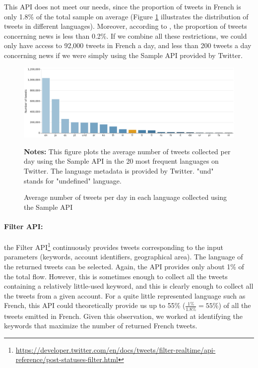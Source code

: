 This API does not meet our needs, since the proportion of tweets in French is only 1.8\% of the total sample on average
(Figure \ref{Figure:HistogramLanguages} illustrates the distribution of tweets in different languages). Moreover, according to \citet{liu_reuters_2016}, the proportion of tweets concerning news is less than 0.2\%. If we combine all these restrictions, we could only have access to 92,000 tweets in French a day, and less than 200 tweets a day concerning news if we were simply using the Sample API provided by Twitter.


\begin{figure}
\begin{center}
\includegraphics[width=1\textwidth]{figures/HistogramLanguages.pdf}
\end{center}
{\scriptsize \textbf{Notes:} This figure plots the average number of tweets collected  per day using the Sample API in the 20 most frequent languages on Twitter. The language metadata is provided by Twitter. "und" stands for "undefined" language.}
\caption{Average number of tweets per day in each language collected using the Sample API}
\label{Figure:HistogramLanguages}
\end{figure}


\paragraph{Filter API:}

the Filter API\footnote{\url{https://developer.twitter.com/en/docs/tweets/filter-realtime/api-reference/post-statuses-filter.html}} continuously provides tweets corresponding to the input parameters (keywords, account identifiers, geographical area). The language of the returned tweets can be selected. Again, the API provides only about 1\% of the total flow. However, this is sometimes enough to collect all the tweets containing a relatively little-used keyword, and this is clearly enough to collect all the tweets from a given account. For a quite little represented language such as French, this API could theoretically provide us up to 55\% ($\frac{1\%}{1.8\%} = 55\%$) of all the tweets emitted in French. Given this observation, we worked at identifying the keywords that maximize the number of returned French tweets.



